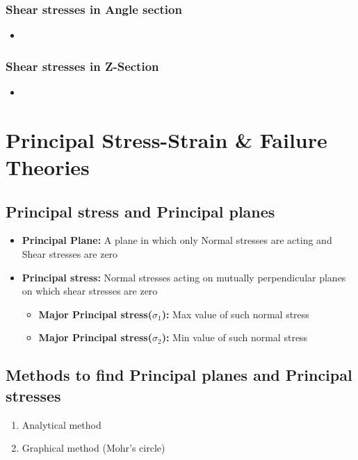 \documentclass[8pt]{report}
\begin{document}
	\subsection{Shear stresses in Angle section}
		\begin{itemize}
			\item
		\end{itemize}\hrulefill
	\subsection{Shear stresses in Z-Section}
		\begin{itemize}
			\item
		\end{itemize}\hrulefill
\chapter{Principal Stress-Strain \& Failure Theories}
	\section{Principal stress and Principal planes}
		\begin{itemize}
			\item \textbf{Principal Plane: }A plane in which only Normal stresses are acting and Shear stresses are zero
			\item \textbf{Principal stress: }Normal stresses acting on mutually perpendicular planes on which shear stresses are zero
			\begin{itemize}
				\item \textbf{Major Principal stress($\sigma_1$): }Max value of such normal stress
				\item \textbf{Major Principal stress($\sigma_2$): }Min value of such normal stress
			\end{itemize}\hrulefill
		\end{itemize}
	\section{Methods to find Principal planes and Principal stresses}
		\begin{enumerate}
			\item Analytical method
			\item Graphical method (Mohr's circle)
		\end{enumerate}\hrulefill			
\end{document}
